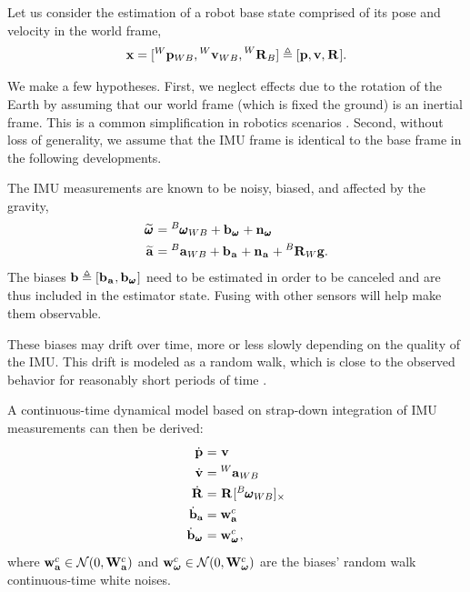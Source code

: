 Let us consider the estimation of a robot base state comprised of its pose and velocity in the world frame,
%
\begin{equation}
    {\bf x} = [\prescript{W}{}{{\bf p}}_{WB}, \prescript{W}{}{{\bf v}}_{WB}, \prescript{W}{}{{\bf R}}_{B}]
    \triangleq 
    [{\bf p}, {\bf v}, \prescript{}{}{{\bf R}}_{}].
\end{equation}

We make a few hypotheses. First, we neglect effects due to the rotation of the Earth by assuming 
that our world frame (which is fixed \wrt the ground) is an inertial frame. This is a common simplification in robotics scenarios \cite{forster2017-TRO}. 
Second, without loss of generality, we assume that the IMU frame is identical to the base frame in the following developments.

The IMU measurements are known to be noisy, biased, and affected by the gravity,
%
\begin{equation}
    \begin{split}
    \prescript{}{}{\widetilde{\pmb{\omega}}}_{} &= \prescript{B}{}{\pmb{\omega}}_{WB} + {\bf b}_{\prescript{}{}{\pmb{\omega}}_{}} + {\bf n}_{\prescript{}{}{\pmb{\omega}}_{}} 
    \\
    \prescript{}{}{\widetilde{{\bf a}}}_{}    &= \prescript{B}{}{{\bf a}}_{WB} + {\bf b}_{\prescript{}{}{{\bf a}}_{}} + {\bf n}_{\prescript{}{}{{\bf a}}_{}} + \prescript{B}{}{{\bf R}}_{W} {\bf g} .
    \end{split}
    \label{eq:imu_meas_model}
\end{equation}
%    
The biases ${\bf b} \triangleq [{\bf b}_{\prescript{}{}{{\bf a}}_{}}, {\bf b}_{\prescript{}{}{\pmb{\omega}}_{}}]$ need to be estimated in order to be canceled and are thus included in the estimator state.
Fusing with other sensors will help make them observable.

These biases may drift over time, more or less slowly depending on the quality of the IMU. This drift is modeled 
as a random walk, which is close to the observed behavior for reasonably short periods of time \cite{hussen2015low}.

A continuous-time dynamical model  based on strap-down integration of IMU measurements can then be derived:
%
\begin{align}
\begin{split}
    \dot{\prescript{}{}{{\bf p}}_{}} &= \prescript{}{}{{\bf v}}_{} \\
    \dot{\prescript{}{}{{\bf v}}_{}} &= \prescript{W}{}{{\bf a}}_{WB} \\
    \dot{\prescript{}{}{{\bf R}}_{}} &= \prescript{}{}{{\bf R}}_{} [\prescript{B}{}{\pmb{\omega}}_{WB}]_{\times} \\
    \dot{{\bf b}}_{{\bf a}} &= {\bf w}_{{\bf a}}^c \\
    \dot{{\bf b}}_{\prescript{}{}{\pmb{\omega}}_{}} &= {\bf w}_{\prescript{}{}{\pmb{\omega}}_{}}^c ,
\end{split}
\label{eq:imu_dyn_conti}
\end{align}
%
where ${\bf w}_{{\bf a}}^c \in \mathcal{N}(0,{\bf W}_{\bf a}^c)$ and ${\bf w}_{{{\bm \omega}}}^c \in \mathcal{N}(0,{\bf W}_{{\bm \omega}}^c)$ are the biases' random walk continuous-time white noises.

